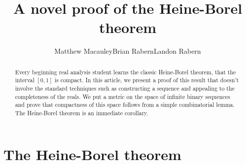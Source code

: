 \documentclass[12pt]{amsart}
\title{A novel proof of the Heine-Borel theorem}
\theoremstyle{plain}
\theoremstyle{definition}
\theoremstyle{remark}
\begin{document}
\thispagestyle{empty}

\author{Matthew Macauley\qquad\qquad Brian Rabern\qquad\qquad Landon
    Rabern}

\begin{abstract}
  Every beginning real analysis student learns the classic Heine-Borel
  theorem, that the interval $[0,1]$ is compact. In this article, we
  present a proof of this result that doesn't involve the standard
  techniques such as constructing a sequence and appealing to the
  completeness of the reals. We put a metric on the space of
  infinite binary sequences and prove that compactness of this space
  follows from a simple combinatorial lemma. The Heine-Borel theorem
  is an immediate corollary.
\end{abstract}



\maketitle

\section{The Heine-Borel theorem}
\end{document}
